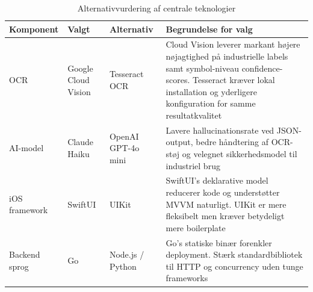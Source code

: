 \begin{table}[H]
  \centering
  \caption{Alternativvurdering af centrale teknologier}
  \label{tab:alternativer}
  \begin{tabularx}{\textwidth}{@{}lllX@{}}
    \toprule
    \textbf{Komponent} & \textbf{Valgt} & \textbf{Alternativ} & \textbf{Begrundelse for valg} \\
    \midrule
    OCR
      & Google Cloud Vision
      & Tesseract OCR
      & Cloud Vision leverer markant højere nøjagtighed på industrielle labels samt symbol-niveau confidence-scores. Tesseract kræver lokal installation og yderligere konfiguration for samme resultatkvalitet \\
    \addlinespace
    AI-model
      & Claude Haiku
      & OpenAI GPT-4o mini
      & Lavere hallucinationsrate ved JSON-output, bedre håndtering af OCR-støj og velegnet sikkerhedsmodel til industriel brug \\
    \addlinespace
    iOS framework
      & SwiftUI
      & UIKit
      & SwiftUI's deklarative model reducerer kode og understøtter MVVM naturligt. UIKit er mere fleksibelt men kræver betydeligt mere boilerplate \\
    \addlinespace
    Backend sprog
      & Go
      & Node.js / Python
      & Go's statiske binær forenkler deployment. Stærk standardbibliotek til HTTP og concurrency uden tunge frameworks \\
    \bottomrule
  \end{tabularx}
\end{table}
